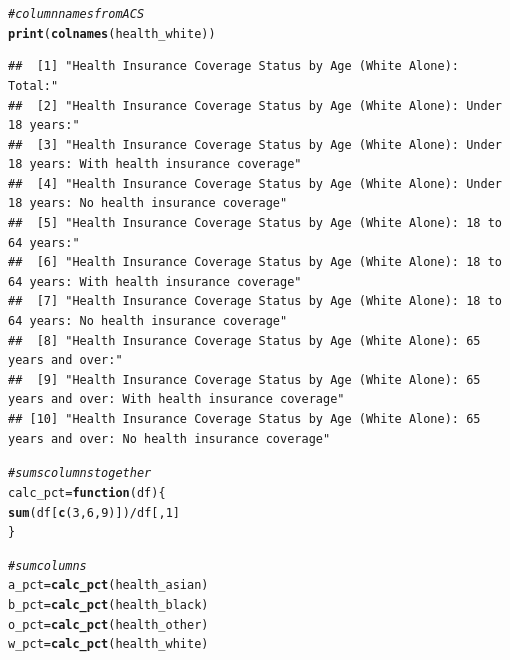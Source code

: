 \documentclass{article}\usepackage[]{graphicx}\usepackage[]{color}
\makeatletter
\newcommand{\hlnum}[1]{\textcolor[rgb]{0.686,0.059,0.569}{#1}}%
\newcommand{\hlcom}[1]{\textcolor[rgb]{0.678,0.584,0.686}{\textit{#1}}}%
\newcommand{\hlopt}[1]{\textcolor[rgb]{0,0,0}{#1}}%
\newcommand{\hlstd}[1]{\textcolor[rgb]{0.345,0.345,0.345}{#1}}%
\newcommand{\hlkwa}[1]{\textcolor[rgb]{0.161,0.373,0.58}{\textbf{#1}}}%
\newcommand{\hlkwb}[1]{\textcolor[rgb]{0.69,0.353,0.396}{#1}}%
\newcommand{\hlkwc}[1]{\textcolor[rgb]{0.333,0.667,0.333}{#1}}%
\newcommand{\hlkwd}[1]{\textcolor[rgb]{0.737,0.353,0.396}{\textbf{#1}}}%
\newenvironment{kframe}{%
 \def\at@end@of@kframe{}%
 \ifinner\ifhmode%
  \def\at@end@of@kframe{\end{minipage}}%
  \begin{minipage}{\columnwidth}%
 \fi\fi%
 \def\FrameCommand##1{\hskip\@totalleftmargin \hskip-\fboxsep
 \colorbox{shadecolor}{##1}\hskip-\fboxsep
     \hskip-\linewidth \hskip-\@totalleftmargin \hskip\columnwidth}%
 \MakeFramed {\advance\hsize-\width
   \@totalleftmargin\z@ \linewidth\hsize
   \@setminipage}}%
 {\par\unskip\endMakeFramed%
 \at@end@of@kframe}
\newenvironment{knitrout}{}{} %
\makeatother
\begin{document}
\begin{knitrout}
\color{fgcolor}\begin{kframe}
\begin{alltt}
\hlcom{# column names from ACS}
\hlkwd{print}\hlstd{(}\hlkwd{colnames}\hlstd{(health_white))}
\end{alltt}
\begin{verbatim}
##  [1] "Health Insurance Coverage Status by Age (White Alone): Total:"                                           
##  [2] "Health Insurance Coverage Status by Age (White Alone): Under 18 years:"                                  
##  [3] "Health Insurance Coverage Status by Age (White Alone): Under 18 years: With health insurance coverage"   
##  [4] "Health Insurance Coverage Status by Age (White Alone): Under 18 years: No health insurance coverage"     
##  [5] "Health Insurance Coverage Status by Age (White Alone): 18 to 64 years:"                                  
##  [6] "Health Insurance Coverage Status by Age (White Alone): 18 to 64 years: With health insurance coverage"   
##  [7] "Health Insurance Coverage Status by Age (White Alone): 18 to 64 years: No health insurance coverage"     
##  [8] "Health Insurance Coverage Status by Age (White Alone): 65 years and over:"                               
##  [9] "Health Insurance Coverage Status by Age (White Alone): 65 years and over: With health insurance coverage"
## [10] "Health Insurance Coverage Status by Age (White Alone): 65 years and over: No health insurance coverage"
\end{verbatim}
\begin{alltt}
\hlcom{# sums columns together}
\hlstd{calc_pct} \hlkwb{=} \hlkwa{function}\hlstd{(}\hlkwc{df}\hlstd{) \{}
    \hlkwd{sum}\hlstd{(df[}\hlkwd{c}\hlstd{(}\hlnum{3}\hlstd{,} \hlnum{6}\hlstd{,} \hlnum{9}\hlstd{)])}\hlopt{/}\hlstd{df[,} \hlnum{1}\hlstd{]}
\hlstd{\}}

\hlcom{# sum columns}
\hlstd{a_pct} \hlkwb{=} \hlkwd{calc_pct}\hlstd{(health_asian)}
\hlstd{b_pct} \hlkwb{=} \hlkwd{calc_pct}\hlstd{(health_black)}
\hlstd{o_pct} \hlkwb{=} \hlkwd{calc_pct}\hlstd{(health_other)}
\hlstd{w_pct} \hlkwb{=} \hlkwd{calc_pct}\hlstd{(health_white)}
\end{alltt}
\end{kframe}
\end{knitrout}
\end{document}
